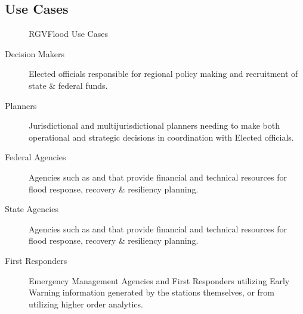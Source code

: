 \documentclass[letterpaper,12pt,english]{book}
\begin{document}
\subsection{Use Cases}
\label{\detokenize{predevelopment/use-cases/use-cases:use-cases}}\label{\detokenize{predevelopment/use-cases/use-cases::doc}}
\begin{figure}[htbp]
\centering
\capstart

\noindent{}
\caption{RGVFlood Use Cases}\label{\detokenize{predevelopment/use-cases/use-cases:id1}}\end{figure}
\begin{description}
\item[{Decision Makers}] \leavevmode
\sphinxAtStartPar
Elected officials responsible for regional policy making and recruitment of state \& federal funds.

\item[{Planners}] \leavevmode
\sphinxAtStartPar
Jurisdictional and multi\sphinxhyphen{}jurisdictional planners needing to make both operational and strategic decisions in coordination with Elected officials.

\item[{Federal Agencies}] \leavevmode
\sphinxAtStartPar
Agencies such as {\hyperref[\detokenize{glossary:term-FEMA}]{}} and {\hyperref[\detokenize{glossary:term-NWS}]{}} that provide financial and technical resources for flood response, recovery \& resiliency planning.

\item[{State Agencies}] \leavevmode
\sphinxAtStartPar
Agencies such as {\hyperref[\detokenize{glossary:term-TGLO}]{}} and {\hyperref[\detokenize{glossary:term-TWDB}]{}} that provide financial and technical resources for flood response, recovery \& resiliency planning.

\item[{First Responders}] \leavevmode
\sphinxAtStartPar
Emergency Management Agencies and First Responders utilizing Early Warning information generated by the {\hyperref[\detokenize{glossary:term-RTHS}]{}} stations themselves, or from {\hyperref[\detokenize{glossary:term-REON.cc}]{}} utilizing higher order analytics.


\end{description}
\end{document}
